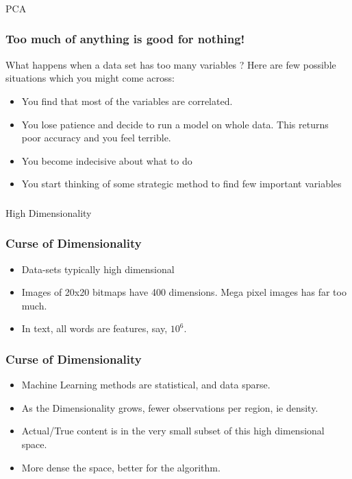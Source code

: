 \begin{frame}[fragile]\frametitle{}
\begin{center}
{\Large PCA}
\end{center}
\end{frame}

\begin{frame}[fragile]\frametitle{ Too much of anything is good for nothing!}
What happens when a data set has too many variables ? Here are few possible situations which you might come across:
\begin{itemize}
\item  You find that most of the variables are correlated.
\item  You lose patience and decide to run a model on whole data. This returns poor accuracy and you feel terrible.
\item  You become indecisive about what to do
\item  You start thinking of some strategic method to find few important variables
\end{itemize}
\end{frame}


\begin{frame}[fragile]\frametitle{}
\begin{center}
{\Large High Dimensionality}
\end{center}
\end{frame}

\begin{frame}[fragile]\frametitle{Curse	of Dimensionality}
\begin{itemize}
\item  Data-sets typically high dimensional	
 \item Images of 20x20 bitmaps have 400 dimensions. Mega pixel images has far too much.
 \item In text, all words are features, say, $10^6$.
\end{itemize}
\end{frame}


\begin{frame}[fragile]\frametitle{Curse	of Dimensionality}
\begin{itemize}
 \item Machine Learning methods are statistical, and data sparse.
 \item As the Dimensionality grows, fewer observations per region, ie density.
 \item Actual/True content is in the very small subset of this high dimensional space.
 \item More dense the space, better for the algorithm.
\end{itemize}
\end{frame}



